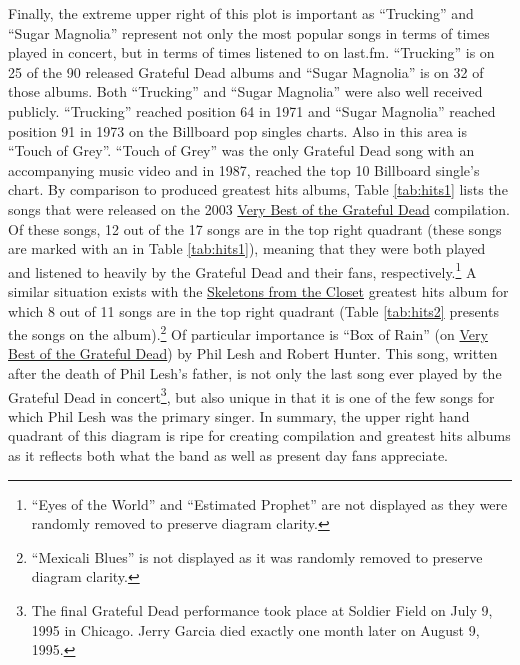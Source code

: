 \documentclass{svmult}
\newcommand{\ttt}[1]{``#1''}
\newcommand{\album}[1]{\uline{#1}}
\begin{document}
Finally, the extreme upper right of this plot is important as \ttt{Trucking} and \ttt{Sugar Magnolia} represent not only the most popular songs in terms of times played in concert, but in terms of times listened to on last.fm. \ttt{Trucking} is on 25 of the 90 released Grateful Dead albums and \ttt{Sugar Magnolia} is on 32 of those albums. Both \ttt{Trucking} and \ttt{Sugar Magnolia} were also well received publicly. \ttt{Trucking} reached position 64 in 1971 and \ttt{Sugar Magnolia} reached position 91 in 1973 on the Billboard pop singles charts. Also in this area is \ttt{Touch of Grey}. \ttt{Touch of Grey} was the only Grateful Dead song with an accompanying music video and in 1987, reached the top 10 Billboard single's chart. By comparison to produced greatest hits albums, Table \ref{tab:hits1} lists the songs that were released on the 2003 \album{Very Best of the Grateful Dead} compilation. Of these songs, 12 out of the 17 songs are in the top right quadrant (these songs are marked with an  in Table \ref{tab:hits1}), meaning that they were both played and listened to heavily by the Grateful Dead and their fans, respectively.\footnote{\ttt{Eyes of the World} and \ttt{Estimated Prophet} are not displayed as they were randomly removed to preserve diagram clarity.} A similar situation exists with the \album{Skeletons from the Closet} greatest hits album for which 8 out of 11 songs are in the top right quadrant \cite{skelcloset:dead1974} (Table \ref{tab:hits2} presents the songs on the album).\footnote{\ttt{Mexicali Blues} is not displayed as it was randomly removed to preserve diagram clarity.} Of particular importance is \ttt{Box of Rain} (on \album{Very Best of the Grateful Dead}) by Phil Lesh and Robert Hunter. This song, written after the death of Phil Lesh's father, is not only the last song ever played by the Grateful Dead in concert\footnote{The final Grateful Dead performance took place at Soldier Field on July 9, 1995 in Chicago. Jerry Garcia died exactly one month later on August 9, 1995.}, but also unique in that it is one of the few songs for which Phil Lesh was the primary singer. In summary, the upper right hand quadrant of this diagram is ripe for creating compilation and greatest hits albums as it reflects both what the band as well as present day fans appreciate.
\end{document}

